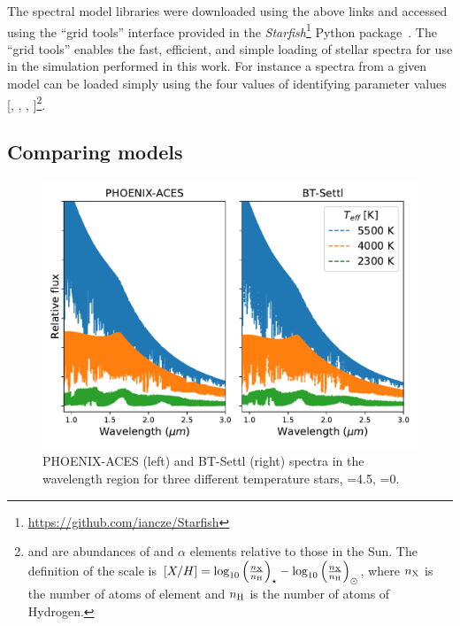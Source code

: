 The spectral model libraries were downloaded using the above links and accessed using the ``grid tools'' interface provided in the \emph{Starfish}\footnote{\url{https://github.com/iancze/Starfish}} Python package~\citep{czekala_constructing_2015}.
The ``grid tools'' enables the fast, efficient, and simple loading of stellar spectra for use in the simulation performed in this work.
For instance a spectra from a given model can be loaded simply using the four values of identifying parameter values [\Teff{}, \logg{}, \feh{}, \alphafe{}]\footnote{\feh{} and \alphafe{} are abundances of  and \(\alpha\) elements relative to those in the Sun. The definition of the scale is \([X/H] = \log_{10}{\left(\frac{n_{\ce{X}}}{n_{\ce{H}}}\right)}_{\star} - \log_{10}{\left(\frac{n_{\ce{X}}}{n_{\ce{H}}}\right)}_{\odot}\), where $n_{\ce{X}}$ is the number of atoms of element  and $n_{\ce{H}}$ is the number of atoms of Hydrogen.}.


\subsection{Comparing models}
\label{subsec:phoenix_comparision}
 \begin{figure}
    \centering
    \includegraphics[width=0.5\linewidth]{figures/atmos_and_models/phoenix_large_scale_comparision}
    \caption[Large scale comparison between the {PHEONIX-ACES} and {BT-Settl} spectra.]{{PHOENIX-ACES} (left) and {BT-Settl} (right) spectra in the \nir{} wavelength region for three different temperature stars, \logg{}=4.5, \feh{}=0.}
    \label{fig:phoenixlargescalecomparision}
\end{figure}

